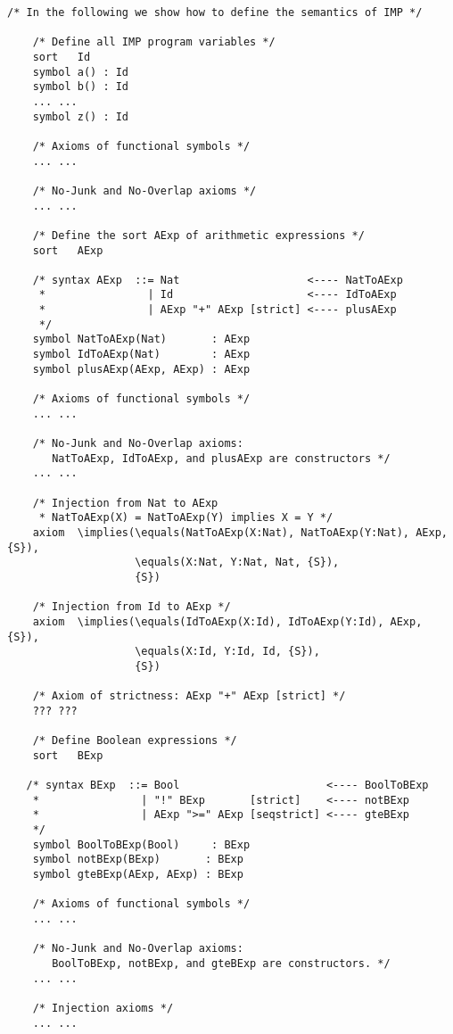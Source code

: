 \documentclass[UTF8,11pt]{article}
\theoremstyle{plain}
\theoremstyle{definition}
\theoremstyle{remark}
\begin{document}
\begin{Verbatim}[fontsize=\small]
    /* In the following we show how to define the semantics of IMP */
    
    /* Define all IMP program variables */
    sort   Id
    symbol a() : Id
    symbol b() : Id
    ... ...
    symbol z() : Id
    
    /* Axioms of functional symbols */
    ... ...
    
    /* No-Junk and No-Overlap axioms */
    ... ...
                   
    /* Define the sort AExp of arithmetic expressions */
    sort   AExp
    
    /* syntax AExp  ::= Nat                    <---- NatToAExp    
     *                | Id                     <---- IdToAExp
     *                | AExp "+" AExp [strict] <---- plusAExp
     */
    symbol NatToAExp(Nat)       : AExp
    symbol IdToAExp(Nat)        : AExp
    symbol plusAExp(AExp, AExp) : AExp
    
    /* Axioms of functional symbols */
    ... ...
    
    /* No-Junk and No-Overlap axioms:
       NatToAExp, IdToAExp, and plusAExp are constructors */
    ... ...
    
    /* Injection from Nat to AExp
     * NatToAExp(X) = NatToAExp(Y) implies X = Y */
    axiom  \implies(\equals(NatToAExp(X:Nat), NatToAExp(Y:Nat), AExp, {S}),
                    \equals(X:Nat, Y:Nat, Nat, {S}), 
                    {S})
   
    /* Injection from Id to AExp */
    axiom  \implies(\equals(IdToAExp(X:Id), IdToAExp(Y:Id), AExp, {S}),
                    \equals(X:Id, Y:Id, Id, {S}),
                    {S})

    /* Axiom of strictness: AExp "+" AExp [strict] */
    ??? ???
    
    /* Define Boolean expressions */
    sort   BExp
    
   /* syntax BExp  ::= Bool                       <---- BoolToBExp    
    *                | "!" BExp       [strict]    <---- notBExp
    *                | AExp ">=" AExp [seqstrict] <---- gteBExp
    */
    symbol BoolToBExp(Bool)     : BExp
    symbol notBExp(BExp)       : BExp
    symbol gteBExp(AExp, AExp) : BExp
    
    /* Axioms of functional symbols */
    ... ...
    
    /* No-Junk and No-Overlap axioms:
       BoolToBExp, notBExp, and gteBExp are constructors. */
    ... ...
    
    /* Injection axioms */
    ... ...
    

\end{Verbatim}
\end{document}
